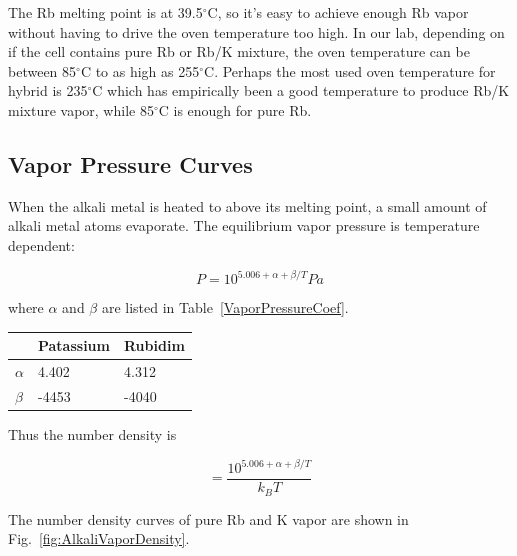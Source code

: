 The Rb melting point is at 39.5$^{\circ}$C, so it's easy to achieve enough Rb vapor without having to drive the oven temperature too high. In our lab, depending on if the cell contains pure Rb or Rb/K mixture, the oven temperature can be between 85$^{\circ}$C to as high as 255$^{\circ}$C. Perhaps the most used oven temperature for hybrid is 235$^{\circ}$C which has empirically been a good temperature to produce Rb/K mixture vapor, while 85$^{\circ}$C is enough for pure Rb.

\subsection{Vapor Pressure Curves}

When the alkali metal is heated to above its melting point, a small amount of alkali metal atoms evaporate. The equilibrium vapor pressure is temperature dependent:

\begin{equation}
P=10^{5.006+\alpha + \beta/T} Pa
\end{equation}

where $\alpha$ and $\beta$ are listed in Table~\ref{VaporPressureCoef}.

\begin{center}\label{VaporPressureCoef}
	\begin{tabular}{| l | l | l |}
		\hline
		& Patassium & Rubidim \\ \hline
		$\alpha$ & 4.402 & 4.312 \\ \hline
		$\beta$ & -4453 & -4040 \\ \hline
	\end{tabular}
\end{center}

Thus the number density is 

\begin{equation}
[A]=\frac{10^{5.006+\alpha+\beta/T}}{k_{B}T}
\end{equation}

The number density curves of pure Rb and K vapor are shown in Fig.~\ref{fig:AlkaliVaporDensity}.

